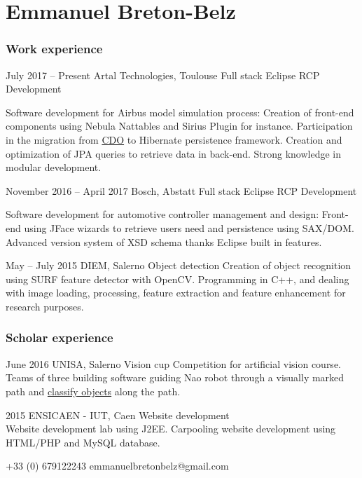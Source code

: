 \documentclass{tccv-master/tccv}
\begin{document}
\part{Emmanuel Breton-Belz}

\section{Work experience}

\begin{eventlist}

\item{July 2017 -- Present}
     {Artal Technologies, Toulouse}
     {Full stack Eclipse RCP Development}

Software development for Airbus model simulation process: Creation of 
front-end components using Nebula Nattables and Sirius Plugin for instance.
Participation in the migration from \href{https://www.eclipse.org/cdo/}{CDO} to Hibernate
persistence framework. Creation and optimization of JPA queries to retrieve 
data in back-end. Strong knowledge in modular development.

\item{November 2016 -- April 2017}
     {Bosch, Abstatt}
     {Full stack Eclipse RCP Development}

Software development for automotive controller management and design:
Front-end using JFace wizards to retrieve users need and persistence using 
SAX/DOM. Advanced version system of XSD schema thanks Eclipse built in
features.

\item{May -- July 2015}
     {DIEM, Salerno}
     {Object detection}
Creation of object recognition using SURF feature detector with OpenCV.
Programming in C++, and dealing with image loading, processing, feature extraction
and feature enhancement for research purposes.

\end{eventlist}

\section{Scholar experience}

\begin{eventlist}
\item{June 2016}
{UNISA, Salerno}
     {Vision cup}
Competition for artificial vision course. Teams of three building software guiding 
Nao robot through a visually marked path and \href{https://github.com/manumanmax/Nao}{classify objects} along the path.

\item{2015}
{ENSICAEN - IUT, Caen}
     {Website development} \\
Website development lab using J2EE.
Carpooling website development using HTML/PHP and MySQL database.

\end{eventlist}
    {+33 (0) 679122243}
    {emmanuelbretonbelz@gmail.com}
\end{document}
